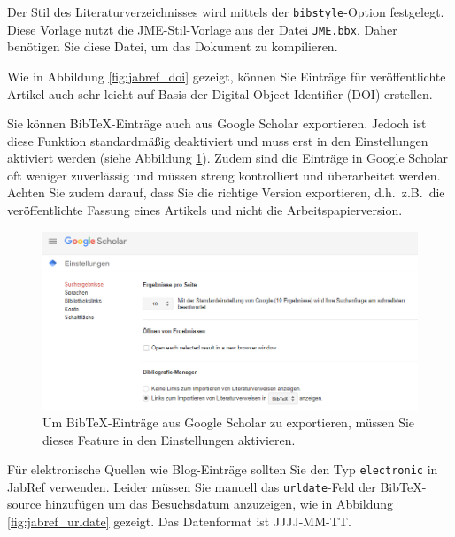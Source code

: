\documentclass[a4paper,12pt]{scrartcl} %
\begin{document}
Der Stil des Literaturverzeichnisses wird mittels der \verb|bibstyle|-Option festgelegt. Diese Vorlage nutzt die JME-Stil-Vorlage aus der Datei \texttt{JME.bbx}. Daher benötigen Sie diese Datei, um das Dokument zu kompilieren.

Wie in Abbildung \ref{fig:jabref_doi} gezeigt, können Sie Einträge für veröffentlichte Artikel auch sehr leicht auf Basis der Digital Object Identifier (DOI) erstellen.

Sie können Bib\TeX-Einträge auch aus Google Scholar exportieren. Jedoch ist diese Funktion standardmäßig deaktiviert und muss erst in den Einstellungen aktiviert werden (siehe Abbildung \ref{fig:scholar}). Zudem sind die Einträge in Google Scholar oft weniger zuverlässig und müssen streng kontrolliert und überarbeitet werden. Achten Sie zudem darauf, dass Sie die richtige Version exportieren, d.h.\ z.B.\ die veröffentlichte Fassung eines Artikels und nicht die Arbeitspapierversion.

\begin{figure}[th!]
\includegraphics[width=16cm]{Scholar}
\caption[Google Scholar]{Um Bib\TeX-Einträge aus Google Scholar zu exportieren, müssen Sie dieses Feature in den Einstellungen aktivieren.}\label{fig:scholar}
\end{figure}

Für elektronische Quellen wie Blog-Einträge \parencite[e.g.\ ][]{Krugman2012} sollten Sie den Typ \texttt{electronic} in JabRef verwenden. Leider müssen Sie manuell das \texttt{urldate}-Feld der Bib\TeX-source hinzufügen um das Besuchsdatum anzuzeigen, wie in Abbildung \ref{fig:jabref_urldate} gezeigt. Das Datenformat ist JJJJ-MM-TT.
\end{document}
